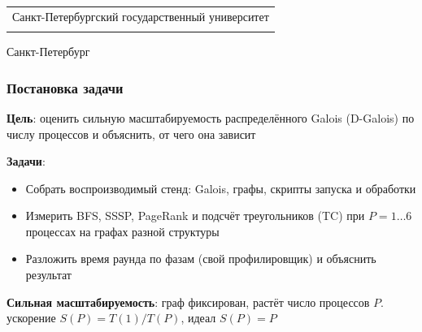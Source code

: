 \documentclass
  [ russian
  , aspectratio=1610
  ] {beamer}
\title[Масштабируемость D-Galois]{\my@title@title@ru}
\author[\my@title@author@ru]{\my@title@author@ru, группа \academicGroup}
\institute[СПбГУ]{}
\date[2026]{}
\makeatletter
\newcommand{\advisorChair}{\my@title@chair@ru}
\newcommand{\defenseYear}{\my@title@year@ru}
\makeatother
\begin{document}
{

\begin{frame}
    \vspace{15pt}
    \begin{center}
        \begin{tabular}{c}
            \scriptsize{Санкт-Петербургский государственный университет} \\
            \scriptsize{\advisorChair}
        \end{tabular}
        \titlepage
    \end{center}

    \btVFill

    \begin{center}
        \vspace{5pt}
        \scriptsize{Санкт-Петербург\\ \defenseYear}
    \end{center}
\end{frame}
}

\begin{frame}
    \frametitle{Постановка задачи}
    \textbf{Цель}: оценить сильную масштабируемость распределённого Galois (D-Galois)
    по числу процессов и объяснить, от чего она зависит
    \vspace{1em}

    \textbf{Задачи}:
    \begin{itemize}
        \item Собрать воспроизводимый стенд: Galois, графы, скрипты запуска и обработки
        \item Измерить BFS, SSSP, PageRank и подсчёт треугольников (TC) при $P = 1\ldots6$
              процессах на графах разной структуры
        \item Разложить время раунда по фазам (свой профилировщик) и объяснить результат
    \end{itemize}

    \vspace{1em}
    {\small \textbf{Сильная масштабируемость}: граф фиксирован, растёт число процессов $P$.
    ускорение $S(P) = T(1)/T(P)$, идеал $S(P) = P$}
\end{frame}
\end{document}
